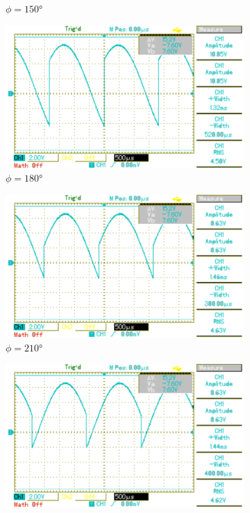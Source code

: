 \begin{figure}[p]
\begin{subfigure}{0.32\textwidth}
		\caption{$\phi=150°$}
	\end{subfigure}
	\begin{subfigure}{0.32\textwidth}
		\includegraphics[width=\textwidth]{Bilder/MAP011.pdf}
		\caption{$\phi=180°$}
	\end{subfigure}
	\begin{subfigure}{0.32\textwidth}
		\includegraphics[width=\textwidth]{Bilder/MAP012.pdf}
		\caption{$\phi=210°$}
	\end{subfigure}
	\begin{subfigure}{0.32\textwidth}
		\includegraphics[width=\textwidth]{Bilder/MAP013.pdf}

\end{subfigure}
\end{figure}
